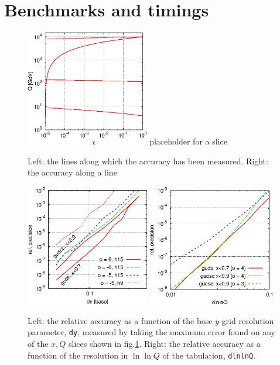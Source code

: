 \documentclass[12pt]{article}
\newcommand{\ttt}[1]{\texttt{#1}}
\begin{document}
\section{Benchmarks and timings}
\label{sec:benchmarks}

\begin{figure}
  \centering
  \includegraphics[width=0.48\textwidth]{../example_f90/test_acc/slices.eps}%
  \hfill
  placeholder for a slice
  \caption{Left: the lines along which the accuracy has been
    measured.  Right: the accuracy along a line}
  \label{fig:lines+aslice}
\end{figure}


\begin{figure}
  \centering
  \includegraphics[width=0.48\textwidth]{../example_f90/test_acc/dy.eps}%
  \hfill
  \includegraphics[width=0.495\textwidth]{../example_f90/test_acc/dlnlnQ.eps}%
  \caption{Left: the relative accuracy as a function of the base
    $y$-grid resolution parameter, \ttt{dy}, measured by taking the
    maximum error found on any of the $x,Q$ slices shown in
    fig.\ref{fig:lines+aslice}.  Right: the relative accuracy as a
    function of the resolution in $\ln \ln Q$ of the tabulation,
    \ttt{dlnlnQ}.}
  \label{fig:dy+dlnlnQ}
\end{figure}
\end{document}
